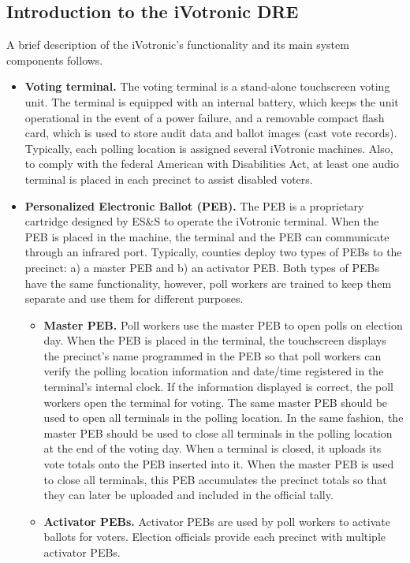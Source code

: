 \label{sec:background}
\smvertspace
\subsection{Introduction to the iVotronic DRE}
\smvertspace
A brief description of the iVotronic's functionality and its main
system components follows. 

\begin{itemize} 
\item \textbf{Voting terminal.} The voting terminal is a stand-alone
  touchscreen voting unit.  The terminal is equipped with an internal
  battery, which keeps the unit operational in the event of a power
  failure, and a removable compact flash card, which is used to store
  audit data and ballot images (cast vote records). Typically, each
  polling location is assigned several iVotronic machines. Also, to
  comply with the federal American with Disabilities Act, at least one
  audio terminal is placed in each precinct to assist disabled
  voters. 

\item \textbf{Personalized Electronic Ballot (PEB).} The PEB is a
  proprietary cartridge designed by ES\&S to operate the iVotronic
  terminal.  When the PEB is placed in the machine, the terminal and
  the PEB can communicate through an infrared port.  Typically,
  counties deploy two types of PEBs to the precinct: a) a master PEB
  and b) an activator PEB. Both types of PEBs have the same
  functionality, however, poll workers are trained to keep them
  separate and use them for different purposes. 
    \begin{itemize}
    \item \textbf{Master PEB.}  Poll workers use the master PEB to
      open polls on election day. When the PEB is placed in the
      terminal, the touchscreen displays the precinct's name
      programmed in the PEB so that poll workers can verify the
      polling location information and date/time registered in the
      terminal's internal clock. If the information displayed is
      correct, the poll workers open the terminal for voting. The same
      master PEB should be used to open all terminals in the polling
      location. In the same fashion, the master PEB should be used to
      close all terminals in the polling location at the end of the
      voting day. When a terminal is closed, it uploads its vote
      totals onto the PEB inserted into it. When the master PEB is
      used to close all terminals, this PEB accumulates the precinct
      totals so that they can later be uploaded and included in the
      official tally. 
    \item \textbf{Activator PEBs.}  Activator PEBs are used by  poll
      workers to activate ballots for voters. Election officials
      provide each precinct with multiple activator PEBs.  
    \end{itemize}
\end{itemize}
